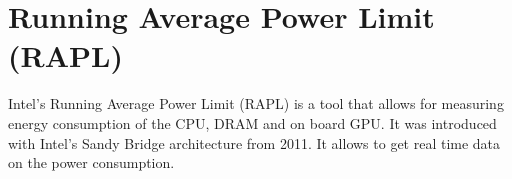 \section*{Running Average Power Limit (RAPL)}
Intel's Running Average Power Limit (RAPL) is a tool that allows for measuring energy consumption of the CPU, DRAM and on board GPU. It was introduced with Intel’s Sandy Bridge architecture from 2011. It allows to get real time data on the power consumption. 